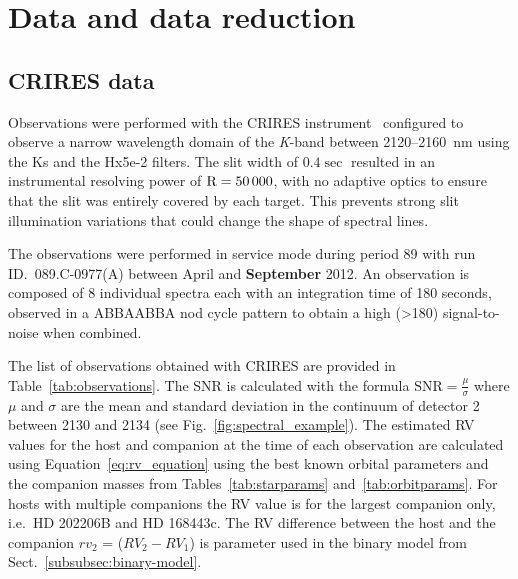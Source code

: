 \documentclass[fleqn,usenatbib]{mnras}
\begin{document}





\section{Data and data reduction}
\label{sec:data}

\subsection{CRIRES data}
\label{subsec:CRIRES}
Observations were performed with the CRIRES instrument~\citep{kaeufl_crires_2004} configured to observe a narrow wavelength domain of the \textit{K}-band between 2120--2160~nm using the {Ks} and the {Hx5e-2} filters. The slit width of \(0.4\sec\) resulted in an instrumental resolving power of \(\rm R=50\,000\), with no adaptive optics to ensure that the slit was entirely covered by each target. This prevents strong slit illumination variations that could change the shape of spectral lines.

The observations were performed in service mode during period 89 with run ID.~089.C-0977(A) between April and \textbf{September} 2012. An observation is composed of 8 individual spectra each with an integration time of 180 seconds, observed in a ABBAABBA nod cycle pattern to obtain a high (>180) signal-to-noise when combined.

{The list of observations obtained with CRIRES are provided in Table~\ref{tab:observations}.  The SNR is calculated with the formula \(\textrm{SNR} = \frac{\mu}{\sigma}\) where $\mu$ and $\sigma$ are the mean and standard deviation in the continuum of detector 2 between 2130 and 2134 (see Fig.~\ref{fig:spectral_example}).
The estimated RV values for the host and companion at the time of each observation are calculated using Equation~\ref{eq:rv_equation} using the best known orbital parameters and the companion masses from Tables~\ref{tab:starparams} and~\ref{tab:orbitparams}. For hosts with multiple companions the RV value is for the largest companion only, i.e.\ {HD 202206}B and {HD 168443}c. The RV difference between the host and the companion \(rv_2\) = (\(RV_2 - RV_1\)) is parameter used in the binary model from Sect.~\ref{subsubsec:binary-model}. }


\end{document}

